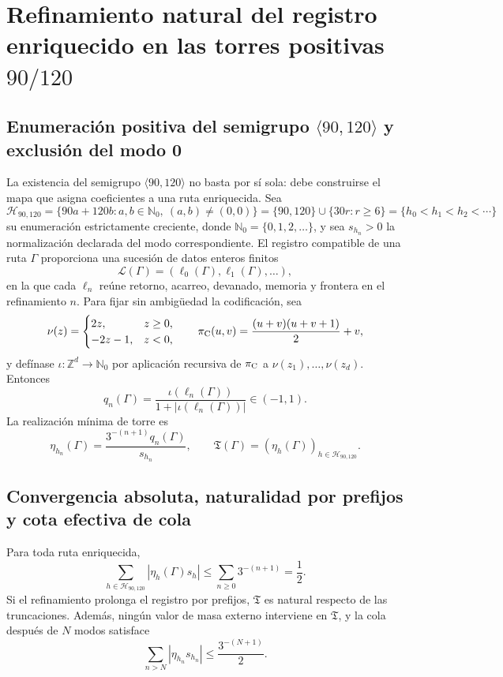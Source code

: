 \section{Refinamiento natural del registro enriquecido en las torres positivas \texorpdfstring{\(90/120\)}{90/120}}

\subsection{Enumeración positiva del semigrupo \texorpdfstring{\(\langle90,120\rangle\)}{<90,120>} y exclusión del modo 0}

La existencia del semigrupo \(\langle90,120\rangle\) no basta por sí sola:
debe construirse el mapa que asigna coeficientes a una ruta enriquecida. Sea
\[
 \mathcal H_{90,120}
 =\{90a+120b:a,b\in\mathbb N_0,\ (a,b)\ne(0,0)\}
 =\{90,120\}\cup\{30r:r\geq6\}
 =\{h_0<h_1<h_2<\cdots\}
\]
su enumeración estrictamente creciente, donde \(\mathbb N_0=\{0,1,2,\ldots\}\),
y sea \(s_{h_n}>0\) la normalización declarada del modo correspondiente. El
registro compatible de una ruta
\(\Gamma\) proporciona una sucesión de datos enteros finitos
\[
 \mathcal L(\Gamma)=(\ell_0(\Gamma),\ell_1(\Gamma),\ldots),
\]
en la que cada \(\ell_n\) reúne retorno, acarreo, devanado, memoria y frontera
en el refinamiento \(n\). Para fijar sin ambigüedad la codificación, sea
\[
 \nu(z)=
 \begin{cases}2z,&z\geq0,\\-2z-1,&z<0,\end{cases}
 \qquad
 \pi_{\rm C}(u,v)=\frac{(u+v)(u+v+1)}2+v,
\]
y defínase \(\iota:\mathbb Z^d\to\mathbb N_0\) por aplicación recursiva de
\(\pi_{\rm C}\) a \(\nu(z_1),\ldots,\nu(z_d)\). Entonces
\[
 q_n(\Gamma)
 =\frac{\iota(\ell_n(\Gamma))}
 {1+|\iota(\ell_n(\Gamma))|}\in(-1,1).
\]
La realización mínima de torre es
\[
 \eta_{h_n}(\Gamma)
 =\frac{3^{-(n+1)}q_n(\Gamma)}{s_{h_n}},
 \qquad
 \mathfrak T(\Gamma)
 =(\eta_h(\Gamma))_{h\in\mathcal H_{90,120}}.
\]

\subsection{Convergencia absoluta, naturalidad por prefijos y cota efectiva de cola}

\begin{theorem}
Para toda ruta enriquecida,
\[
 \sum_{h\in\mathcal H_{90,120}}|\eta_h(\Gamma)s_h|
 \leq\sum_{n\ge0}3^{-(n+1)}=\frac12.
\]
Si el refinamiento prolonga el registro por prefijos, \(\mathfrak T\) es natural
respecto de las truncaciones. Además, ningún valor de masa externo interviene
en \(\mathfrak T\), y la cola después de \(N\) modos satisface
\[
 \sum_{n>N}|\eta_{h_n}s_{h_n}|
 \leq\frac{3^{-(N+1)}}2.
\]
\end{theorem}

